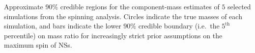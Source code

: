 \label{fig:comp_masses} Approximate 90\% credible regions for the component-mass estimates of $5$ selected simulations from the spinning analysis.  Circles indicate the true masses of each simulation, and bars indicate the lower $90\%$ credible boundary (i.e.\ the $5^\mathrm{th}$ percentile) on mass ratio for increasingly strict prior assumptions on the maximum spin of NSs.
  
  
  